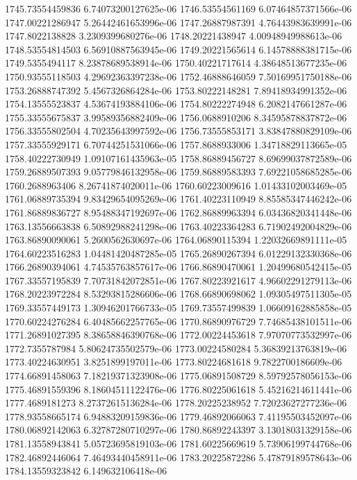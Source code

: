 {1745.73554459836 6.74073200127625e-06
1746.53554561169 6.07464857371566e-06
1747.00221286947 5.26442461653996e-06
1747.26887987391 4.76443983639991e-06
1747.8022138828 3.2309399680276e-06
1748.20221438947 4.00948949988613e-06
1748.53554814503 6.56910887563945e-06
1749.20221565614 6.14578888381715e-06
1749.5355494117 8.23878689538914e-06
1750.40221717614 4.38648513677235e-06
1750.93555118503 4.29692363397238e-06
1752.46888646059 7.50169951750188e-06
1753.26888747392 5.4567326864284e-06
1753.80222148281 7.89418934991352e-06
1754.13555523837 4.53674193884106e-06
1754.80222274948 6.2082147661287e-06
1755.33555675837 3.99589356882409e-06
1756.0688910206 8.34595878837872e-06
1756.33555802504 4.70235643997592e-06
1756.73555853171 3.83847880829109e-06
1757.33555929171 6.70744251531066e-06
1757.8688933006 1.34718829113665e-05
1758.40222730949 1.09107161435963e-05
1758.86889456727 8.69699037872589e-06
1759.26889507393 9.05779846132958e-06
1759.86889583393 7.69221058685285e-06
1760.2688963406 8.26741874020011e-06
1760.60223009616 1.01433102003469e-05
1761.06889735394 9.83429654095269e-06
1761.40223110949 8.85585347446242e-06
1761.86889836727 8.95488347192697e-06
1762.86889963394 6.03436820341448e-06
1763.13556663838 6.50892988241298e-06
1763.40223364283 6.71902492004829e-06
1763.86890090061 5.2600562630697e-06
1764.06890115394 1.22032669891111e-05
1764.60223516283 1.04481420487285e-05
1765.26890267394 6.01229132330368e-06
1766.26890394061 4.74535763857617e-06
1766.86890470061 1.20499680542415e-05
1767.33557195839 7.70731842072851e-06
1767.80223921617 4.96602291279113e-06
1768.20223972284 8.53293815286606e-06
1768.66890698062 1.09305497511305e-05
1769.33557449173 1.30946201766733e-05
1769.73557499839 1.06609162885858e-05
1770.60224276284 6.40485662257765e-06
1770.86890976729 7.74685438101511e-06
1771.26891027395 8.38658846390768e-06
1772.00224453618 7.97070773532997e-06
1772.7355787984 5.80624735502579e-06
1773.00224580284 5.36839213763819e-06
1773.40224630951 3.8251899197011e-06
1773.80224681618 9.7822700186609e-06
1774.66891458063 7.18219371323908e-06
1775.06891508729 8.59792578056153e-06
1775.46891559396 8.18604511122476e-06
1776.80225061618 5.45216214611441e-06
1777.4689181273 8.27372615136284e-06
1778.20225238952 7.72023627277236e-06
1778.93558665174 6.94883209159836e-06
1779.46892066063 7.41195503452097e-06
1780.06892142063 6.32787280710297e-06
1780.86892243397 3.13018031329158e-06
1781.13558943841 5.05723695819103e-06
1781.60225669619 5.73906199744768e-06
1782.46892446064 7.46493440458911e-06
1783.20225872286 5.47879189578643e-06
1784.13559323842 6.149632106418e-06
}

